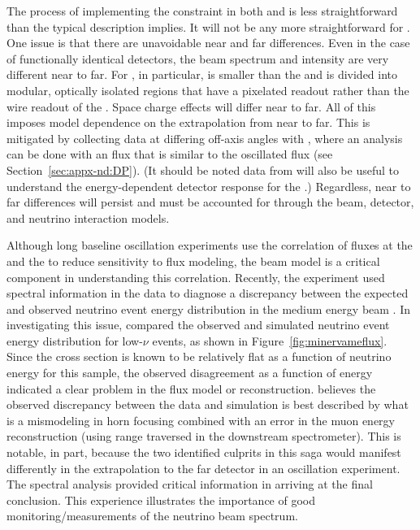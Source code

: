 The process of implementing the   constraint in both  and    is less straightforward than the typical description implies.  It will not be any more straightforward for .  One issue is that there are unavoidable near and far differences. Even in the case of functionally identical detectors, the beam spectrum and intensity are very different near to far.  For , in particular, 
 is smaller than the  and is divided into modular, optically isolated regions that have a pixelated readout rather than the wire readout of the .  Space charge effects will differ near to far.  All of this imposes model dependence on the extrapolation from near to far.  This is mitigated by collecting data at differing off-axis angles with , where an analysis can be done with an  flux that is similar to the oscillated  flux (see Section~\ref{sec:appx-nd:DP}). (It should be noted data from  will also be useful to understand the energy-dependent detector response for the .)  Regardless, near to far differences will persist and must be accounted for through the beam, detector, and neutrino interaction models.  

Although long baseline oscillation experiments use the correlation of fluxes at the  and the  to reduce sensitivity to flux modeling, the beam model is a critical component in understanding this correlation.  Recently, the  experiment used spectral information in the data to diagnose a discrepancy between the expected and observed neutrino event energy distribution in the  medium energy beam \cite{JenaNUINT2018}. In investigating this issue,  compared the observed and simulated neutrino event energy distribution for low-$\nu$ events, as shown in Figure~\ref{fig:minervameflux}.  Since the cross section is known to be relatively flat as a function of neutrino energy for this sample, the observed disagreement as a function of energy indicated a clear problem in the flux model or reconstruction.      
 believes the observed discrepancy between the data and simulation is best described by what is a mismodeling in horn focusing combined with an error in the muon energy reconstruction (using range traversed in the downstream spectrometer).  This is notable, in part, because the two identified culprits in this saga would manifest differently in the extrapolation to the far detector in an oscillation experiment. The spectral analysis provided critical information in arriving at the final conclusion.  This experience illustrates the importance of good monitoring/measurements of the neutrino beam spectrum.  

